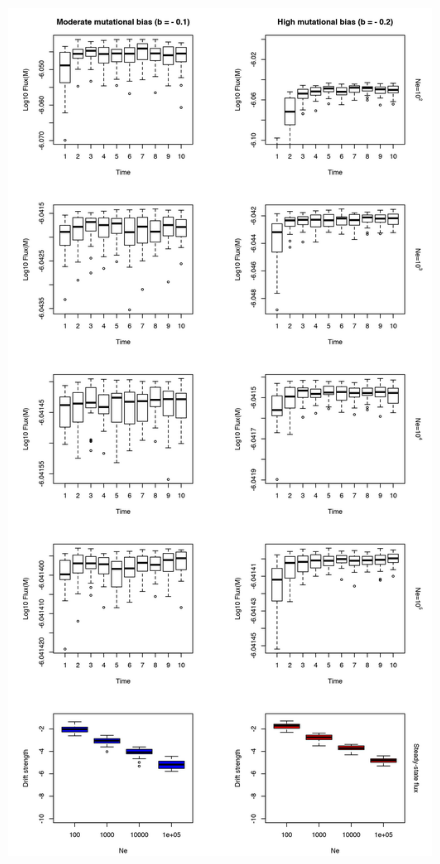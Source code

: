 \begin{figure}[H]
\vspace{-0.5cm}
\begin{center}
\includegraphics[scale=0.5,trim=0cm 0cm 0cm 0cm,clip]{pics/SM-Enzymes/Evo_SteadyState_MutCorr_LowF.jpeg} 

\end{center}
\end{figure}

